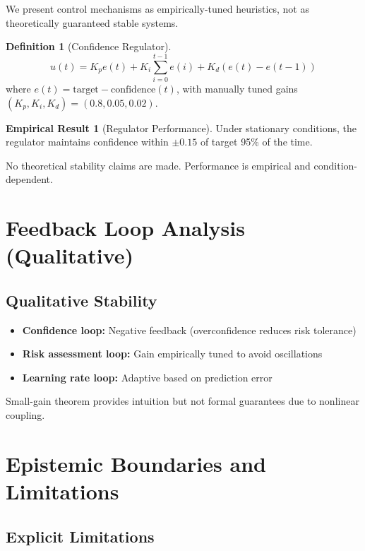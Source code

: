 \documentclass[12pt]{article}
\theoremstyle{definition}
\newtheorem{definition}{Definition}[section]
\newtheorem{empirical}{Empirical Result}[section]
\begin{document}
We present control mechanisms as empirically-tuned heuristics, not as theoretically guaranteed stable systems.

\begin{definition}[Confidence Regulator]
\[
u(t) = K_p e(t) + K_i \sum_{i=0}^{t-1} e(i) + K_d (e(t) - e(t-1))
\]
where $e(t) = \text{target} - \text{confidence}(t)$, with manually tuned gains $(K_p, K_i, K_d) = (0.8, 0.05, 0.02)$.
\end{definition}

\begin{empirical}[Regulator Performance]
Under stationary conditions, the regulator maintains confidence within $\pm 0.15$ of target 95\% of the time.
\end{empirical}

\begin{remark}
No theoretical stability claims are made. Performance is empirical and condition-dependent.
\end{remark}

\section{Feedback Loop Analysis (Qualitative)}

\subsection{Qualitative Stability}

\begin{itemize}
    \item \textbf{Confidence loop:} Negative feedback (overconfidence reduces risk tolerance)
    \item \textbf{Risk assessment loop:} Gain empirically tuned to avoid oscillations
    \item \textbf{Learning rate loop:} Adaptive based on prediction error
\end{itemize}

\begin{remark}
Small-gain theorem provides intuition but not formal guarantees due to nonlinear coupling.
\end{remark}

\section{Epistemic Boundaries and Limitations}

\subsection{Explicit Limitations}
\end{document}
